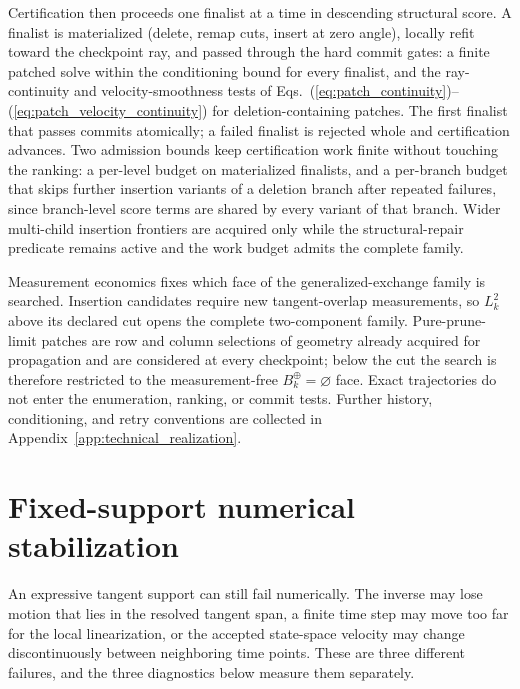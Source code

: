 \documentclass[
  reprint,
  amsmath,
  amssymb,
  aps,
  pra,
  nofootinbib,
  superscriptaddress,
  floatfix
]{revtex4-2}
\begin{document}
Certification then proceeds one finalist at a time in descending structural score.  A finalist is materialized (delete, remap cuts, insert at zero angle), locally refit toward the checkpoint ray, and passed through the hard commit gates: a finite patched solve within the conditioning bound for every finalist, and the ray-continuity and velocity-smoothness tests of Eqs.~(\ref{eq:patch_continuity})--(\ref{eq:patch_velocity_continuity}) for deletion-containing patches.  The first finalist that passes commits atomically; a failed finalist is rejected whole and certification advances.  Two admission bounds keep certification work finite without touching the ranking: a per-level budget on materialized finalists, and a per-branch budget that skips further insertion variants of a deletion branch after repeated failures, since branch-level score terms are shared by every variant of that branch.  Wider multi-child insertion frontiers are acquired only while the structural-repair predicate remains active and the work budget admits the complete family.

Measurement economics fixes which face of the generalized-exchange family is searched.  Insertion candidates require new tangent-overlap measurements, so $L_k^2$ above its declared cut opens the complete two-component family.  Pure-prune-limit patches are row and column selections of geometry already acquired for propagation and are considered at every checkpoint; below the cut the search is therefore restricted to the measurement-free $B_k^{\oplus}=\varnothing$ face.  Exact trajectories do not enter the enumeration, ranking, or commit tests.  Further history, conditioning, and retry conventions are collected in Appendix~\ref{app:technical_realization}.

\section{Fixed-support numerical stabilization}
\label{sec:numerical_solve_repair}
\label{sec:numerical_stabilization}

An expressive tangent support can still fail numerically.  The inverse may lose motion that lies in the resolved tangent span, a finite time step may move too far for the local linearization, or the accepted state-space velocity may change discontinuously between neighboring time points.  These are three different failures, and the three diagnostics below measure them separately.
\end{document}
